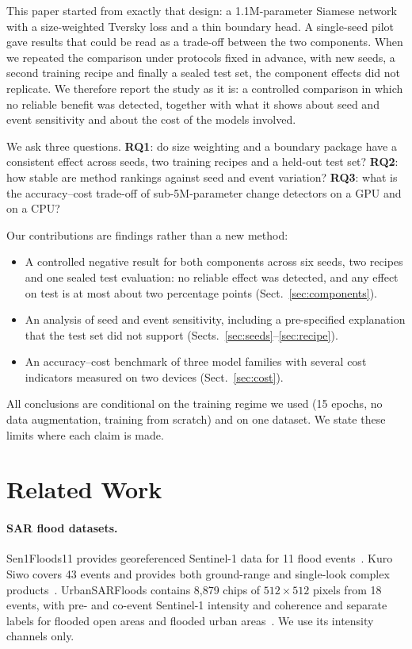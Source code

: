 \documentclass[runningheads]{llncs}
\begin{document}
This paper started from exactly that design: a 1.1M-parameter Siamese network with a
size-weighted Tversky loss and a thin boundary head. A single-seed pilot gave results that
could be read as a trade-off between the two components. When we repeated the comparison
under protocols fixed in advance, with new seeds, a second training recipe and finally a
sealed test set, the component effects did not replicate. We therefore report the study as
it is: a controlled comparison in which no reliable benefit was detected, together with what
it shows about seed and event sensitivity and about the cost of the models involved.

We ask three questions. \textbf{RQ1}: do size weighting and a boundary package have a
consistent effect across seeds, two training recipes and a held-out test set? \textbf{RQ2}:
how stable are method rankings against seed and event variation? \textbf{RQ3}: what is the
accuracy--cost trade-off of sub-5M-parameter change detectors on a GPU and on a CPU?

Our contributions are findings rather than a new method:
\begin{itemize}
\item A controlled negative result for both components across six seeds, two recipes and one
sealed test evaluation: no reliable effect was detected, and any effect on test is at most
about two percentage points (Sect.~\ref{sec:components}).
\item An analysis of seed and event sensitivity, including a pre-specified explanation that
the test set did not support (Sects.~\ref{sec:seeds}--\ref{sec:recipe}).
\item An accuracy--cost benchmark of three model families with several cost indicators
measured on two devices (Sect.~\ref{sec:cost}).
\end{itemize}

All conclusions are conditional on the training regime we used (15 epochs, no data
augmentation, training from scratch) and on one dataset. We state these limits where each
claim is made.

\section{Related Work}

\paragraph{SAR flood datasets.} Sen1Floods11 provides georeferenced Sentinel-1 data for 11 flood
events~\cite{bonafilia2020sen1floods11}. Kuro Siwo covers 43 events and provides both ground-range and single-look complex
products~\cite{bountos2024kurosiwo}. UrbanSARFloods contains
8,879 chips of $512\times 512$ pixels from 18 events, with pre- and co-event Sentinel-1
intensity and coherence and separate labels for flooded open areas and flooded urban
areas~\cite{zhao2024urbansarfloods}. We use its intensity channels only.
\end{document}
